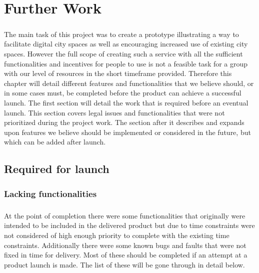 \chapter{Further Work}
\label{chap:Further}

\paragraph{} The main task of this project was to create a prototype illustrating a way to facilitate digital city spaces as well as encouraging increased use of existing city spaces. However the full scope of creating such a service with all the sufficient functionalities and incentives for people to use is not a feasible task for a group with our level of resources in the short timeframe provided. Therefore this chapter will detail different features and functionalities that we believe should, or in some cases must, be completed before the product can achieve a successful launch. The first section will detail the work that is required before an eventual launch. This section covers legal issues and functionalities that were not prioritized during the project work. The section after it describes and expands upon features we believe should be implemented or considered in the future, but which can be added after launch.

\section{Required for launch}
\label{sec:FurtherRequired}

\subsection{Lacking functionalities}
\label{subsec:FurtherRequiredLacking}

\paragraph{} At the point of completion there were some functionalities that originally were intended to be included in the delivered product but due to time constraints were not considered of high enough priority to complete with the existing time constraints. Additionally there were some known bugs and faults that were not fixed in time for delivery. Most of these should be completed if an attempt at a product launch is made. The list of these will be gone through in detail below.

